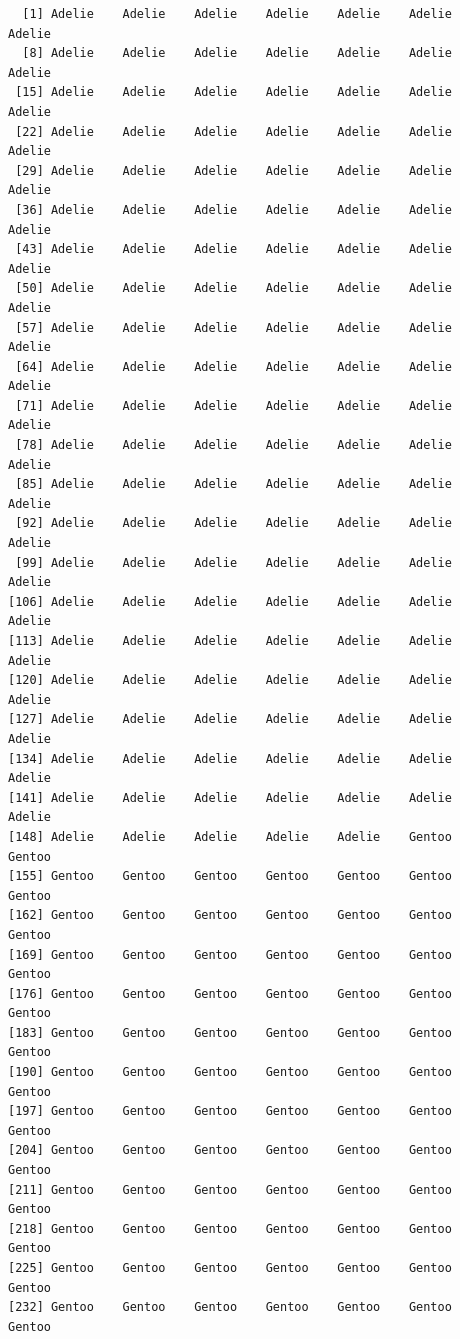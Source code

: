 \documentclass[
  a4paper,
  DIV=11,
  numbers=noendperiod,
  oneside]{scrreprt}
\begin{document}
\begin{verbatim}
  [1] Adelie    Adelie    Adelie    Adelie    Adelie    Adelie    Adelie   
  [8] Adelie    Adelie    Adelie    Adelie    Adelie    Adelie    Adelie   
 [15] Adelie    Adelie    Adelie    Adelie    Adelie    Adelie    Adelie   
 [22] Adelie    Adelie    Adelie    Adelie    Adelie    Adelie    Adelie   
 [29] Adelie    Adelie    Adelie    Adelie    Adelie    Adelie    Adelie   
 [36] Adelie    Adelie    Adelie    Adelie    Adelie    Adelie    Adelie   
 [43] Adelie    Adelie    Adelie    Adelie    Adelie    Adelie    Adelie   
 [50] Adelie    Adelie    Adelie    Adelie    Adelie    Adelie    Adelie   
 [57] Adelie    Adelie    Adelie    Adelie    Adelie    Adelie    Adelie   
 [64] Adelie    Adelie    Adelie    Adelie    Adelie    Adelie    Adelie   
 [71] Adelie    Adelie    Adelie    Adelie    Adelie    Adelie    Adelie   
 [78] Adelie    Adelie    Adelie    Adelie    Adelie    Adelie    Adelie   
 [85] Adelie    Adelie    Adelie    Adelie    Adelie    Adelie    Adelie   
 [92] Adelie    Adelie    Adelie    Adelie    Adelie    Adelie    Adelie   
 [99] Adelie    Adelie    Adelie    Adelie    Adelie    Adelie    Adelie   
[106] Adelie    Adelie    Adelie    Adelie    Adelie    Adelie    Adelie   
[113] Adelie    Adelie    Adelie    Adelie    Adelie    Adelie    Adelie   
[120] Adelie    Adelie    Adelie    Adelie    Adelie    Adelie    Adelie   
[127] Adelie    Adelie    Adelie    Adelie    Adelie    Adelie    Adelie   
[134] Adelie    Adelie    Adelie    Adelie    Adelie    Adelie    Adelie   
[141] Adelie    Adelie    Adelie    Adelie    Adelie    Adelie    Adelie   
[148] Adelie    Adelie    Adelie    Adelie    Adelie    Gentoo    Gentoo   
[155] Gentoo    Gentoo    Gentoo    Gentoo    Gentoo    Gentoo    Gentoo   
[162] Gentoo    Gentoo    Gentoo    Gentoo    Gentoo    Gentoo    Gentoo   
[169] Gentoo    Gentoo    Gentoo    Gentoo    Gentoo    Gentoo    Gentoo   
[176] Gentoo    Gentoo    Gentoo    Gentoo    Gentoo    Gentoo    Gentoo   
[183] Gentoo    Gentoo    Gentoo    Gentoo    Gentoo    Gentoo    Gentoo   
[190] Gentoo    Gentoo    Gentoo    Gentoo    Gentoo    Gentoo    Gentoo   
[197] Gentoo    Gentoo    Gentoo    Gentoo    Gentoo    Gentoo    Gentoo   
[204] Gentoo    Gentoo    Gentoo    Gentoo    Gentoo    Gentoo    Gentoo   
[211] Gentoo    Gentoo    Gentoo    Gentoo    Gentoo    Gentoo    Gentoo   
[218] Gentoo    Gentoo    Gentoo    Gentoo    Gentoo    Gentoo    Gentoo   
[225] Gentoo    Gentoo    Gentoo    Gentoo    Gentoo    Gentoo    Gentoo   
[232] Gentoo    Gentoo    Gentoo    Gentoo    Gentoo    Gentoo    Gentoo   

\end{verbatim}
\end{document}
